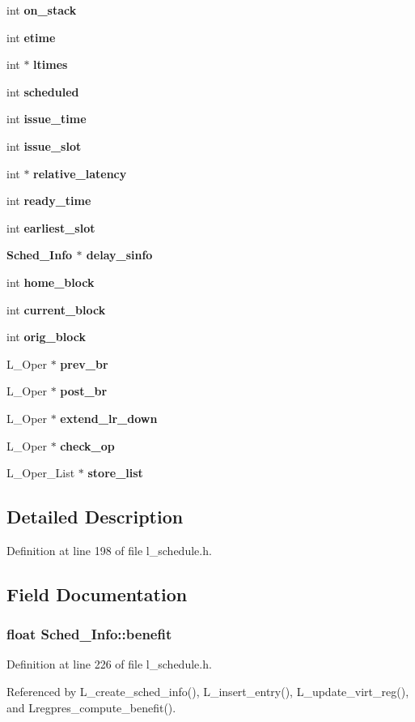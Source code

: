 \begin{CompactItemize}
int \bf{on\_\-stack}
\item 
int \bf{etime}
\item 
int $\ast$ \bf{ltimes}
\item 
int \bf{scheduled}
\item 
int \bf{issue\_\-time}
\item 
int \bf{issue\_\-slot}
\item 
int $\ast$ \bf{relative\_\-latency}
\item 
int \bf{ready\_\-time}
\item 
int \bf{earliest\_\-slot}
\item 
\bf{Sched\_\-Info} $\ast$ \bf{delay\_\-sinfo}
\item 
int \bf{home\_\-block}
\item 
int \bf{current\_\-block}
\item 
int \bf{orig\_\-block}
\item 
L\_\-Oper $\ast$ \bf{prev\_\-br}
\item 
L\_\-Oper $\ast$ \bf{post\_\-br}
\item 
L\_\-Oper $\ast$ \bf{extend\_\-lr\_\-down}
\item 
L\_\-Oper $\ast$ \bf{check\_\-op}
\item 
L\_\-Oper\_\-List $\ast$ \bf{store\_\-list}
\end{CompactItemize}


\subsection{Detailed Description}




Definition at line 198 of file l\_\-schedule.h.

\subsection{Field Documentation}
\subsubsection{\setlength{\rightskip}{0pt plus 5cm}float \bf{Sched\_\-Info::benefit}}\label{structSched__Info_823e7ab4887d9431cb14ad7a21f390c0}




Definition at line 226 of file l\_\-schedule.h.

Referenced by L\_\-create\_\-sched\_\-info(), L\_\-insert\_\-entry(), L\_\-update\_\-virt\_\-reg(), and Lregpres\_\-compute\_\-benefit().
